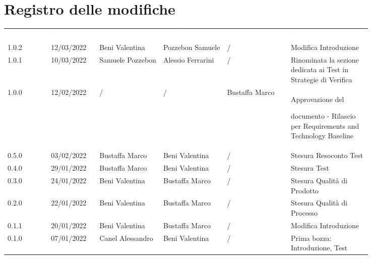 \section*{Registro delle modifiche}

{\renewcommand{\arraystretch}{1.5}
\scriptsize
\begin{tabular}{p{0.10\linewidth}p{0.10\linewidth}p{0.15\linewidth}p{0.15\linewidth}p{0.15\linewidth}p{0.19\linewidth}}
	\rowcolor[RGB]{33, 73, 50}
	\textcolor{white}{\textbf{Versione}} & \textcolor{white}{\textbf{Data}} &
	\textcolor{white}{\textbf{Redattore}} & \textcolor{white}{\textbf{Verificatore}} &
	\textcolor{white}{\textbf{Approvatore}} & \textcolor{white}{\textbf{Descrizione}}\\
	\rowcolor[RGB]{216, 235, 171}
	1.0.2 & 12/03/2022 & Beni Valentina & Pozzebon Samuele & /& Modifica Introduzione\\
	\rowcolor[RGB]{233, 245, 206}
  	1.0.1 & 10/03/2022 & Samuele Pozzebon & Alessio Ferrarini &/& Rinominata la sezione dedicata ai Test in Strategie di Verifica\\
	\rowcolor[RGB]{216, 235, 171}
	1.0.0 & 12/02/2022 & / & / & Bustaffa Marco & Approvazione del \par documento - Rilascio per Requirements and Technology Baseline\\
	\rowcolor[RGB]{233, 245, 206}
	0.5.0 & 03/02/2022 & Bustaffa Marco& Beni Valentina &/& Stesura Resoconto Test\\
	\rowcolor[RGB]{216, 235, 171}
	0.4.0 & 29/01/2022 & Bustaffa Marco& Beni Valentina &/& Stesura Test\\
	\rowcolor[RGB]{233, 245, 206}
	0.3.0 & 24/01/2022 & Beni Valentina& Bustaffa Marco &/& Stesura Qualità di Prodotto\\
	\rowcolor[RGB]{216, 235, 171}
	0.2.0 & 22/01/2022 & Beni Valentina& Bustaffa Marco &/& Stesura Qualità di Processo\\
	\rowcolor[RGB]{233, 245, 206}
	0.1.1 & 20/01/2022 & Beni Valentina& Bustaffa Marco &/& Modifica Introduzione\\
	\rowcolor[RGB]{216, 235, 171}
	0.1.0 & 07/01/2022 & Canel Alessandro& Beni Valentina &/& Prima bozza: Introduzione, Test\\
	
	
	
	
	 
	
  	
\end{tabular}
}
